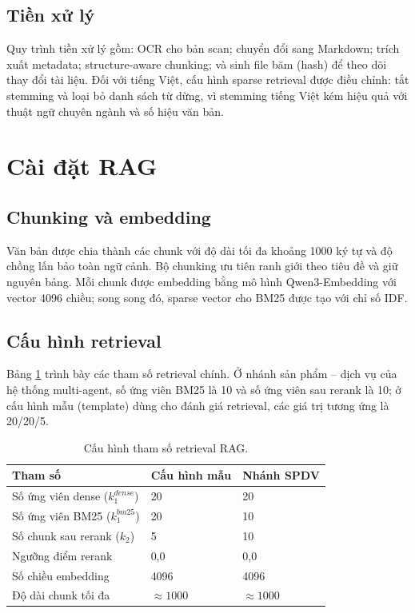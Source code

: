 \subsection{Tiền xử lý}

Quy trình tiền xử lý gồm: OCR cho bản scan; chuyển đổi sang Markdown; trích xuất metadata;
structure-aware chunking; và sinh file băm (hash) để theo dõi thay đổi tài liệu. Đối
với tiếng Việt, cấu hình sparse retrieval được điều chỉnh: tắt stemming và loại bỏ danh sách
từ dừng, vì stemming tiếng Việt kém hiệu quả với thuật ngữ chuyên ngành và số hiệu văn bản.

\section{Cài đặt RAG}
\label{sec:cai-dat-rag}

\subsection{Chunking và embedding}

Văn bản được chia thành các chunk với độ dài tối đa khoảng 1000 ký tự và độ chồng lấn bảo
toàn ngữ cảnh. Bộ chunking ưu tiên ranh giới theo tiêu đề và giữ nguyên bảng. Mỗi chunk
được embedding bằng mô hình Qwen3-Embedding với vector 4096 chiều; song song đó, sparse vector
cho BM25 được tạo với chỉ số IDF.

\subsection{Cấu hình retrieval}

Bảng \ref{tab:rag-params} trình bày các tham số retrieval chính. Ở nhánh sản phẩm -- dịch vụ
của hệ thống multi-agent, số ứng viên BM25 là 10 và số ứng viên sau rerank là 10; ở
cấu hình mẫu (template) dùng cho đánh giá retrieval, các giá trị tương ứng là 20/20/5.

\begin{table}[htbp]
\centering
\caption{Cấu hình tham số retrieval RAG.}
\label{tab:rag-params}
\small
\begin{tabular}{@{}p{5.2cm}p{4.6cm}p{4.4cm}@{}}
\toprule
\textbf{Tham số} & \textbf{Cấu hình mẫu} & \textbf{Nhánh SPDV} \\
\midrule
Số ứng viên dense ($k_1^{dense}$) & 20 & 20 \\
Số ứng viên BM25 ($k_1^{bm25}$) & 20 & 10 \\
Số chunk sau rerank ($k_2$) & 5 & 10 \\
Ngưỡng điểm rerank & 0,0 & 0,0 \\
Số chiều embedding & 4096 & 4096 \\
Độ dài chunk tối đa & $\approx 1000$ & $\approx 1000$ \\
\bottomrule
\end{tabular}
\end{table}

